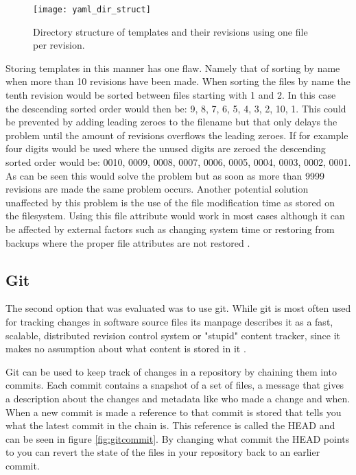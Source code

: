 \begin{figure}[h!]
	\centering
	\texttt{[image: yaml\_dir\_struct]}
	\caption{Directory structure of templates and their revisions using one file per revision.}
	\label{fig:diskstruct}
\end{figure}

Storing templates in this manner has one flaw.
Namely that of sorting by name when more than 10 revisions have been made.
When sorting the files by name the tenth revision would be sorted between files starting with 1 and 2.
In this case the descending sorted order would then be: 9, 8, 7, 6, 5, 4, 3, 2, 10, 1.
This could be prevented by adding leading zeroes to the filename but that only delays the problem until the amount of revisions overflows the leading zeroes.
If for example four digits would be used where the unused digits are zeroed the descending sorted order would be: 0010, 0009, 0008, 0007, 0006, 0005, 0004, 0003, 0002, 0001.
As can be seen this would solve the problem but as soon as more than 9999 revisions are made the same problem occurs.
Another potential solution unaffected by this problem is the use of the file modification time as stored on the filesystem.
Using this file attribute would work in most cases although it can be affected by external factors such as changing system time or restoring from backups where the proper file attributes are not restored \cite{noauthor_mtime_2018}.

\subsection{Git}
The second option that was evaluated was to use git.
While git is most often used for tracking changes in software source files its manpage describes it as a fast, scalable, distributed revision control system or "stupid" content tracker, since it makes no assumption about what content is stored in it \cite{truyers_git_2016}.

Git can be used to keep track of changes in a repository by chaining them into commits.
Each commit contains a snapshot of a set of files, a message that gives a description about the changes and metadata like who made a change and when.
When a new commit is made a reference to that commit is stored that tells you what the latest commit in the chain is.
This reference is called the HEAD and can be seen in figure \ref{fig:gitcommit}.
By changing what commit the HEAD points to you can revert the state of the files in your repository back to an earlier commit.

